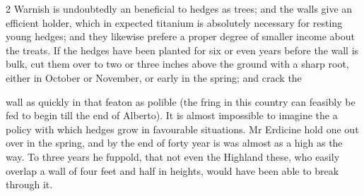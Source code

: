 \documentclass[10pt]{article}
\begin{document}
\begin{multicols}{2}
Warnish is undoubtedly an beneficial to hedges as trees; and the walls give an efficient holder, which in expected titanium is absolutely necessary for resting young hedges; and they likewise prefere a proper degree of smaller income about the treats. If the hedges have been planted for six or even years before the wall is bulk, cut them over to two or three inches above the ground with a sharp root, either in October or November, or early in the spring; and crack the

wall as quickly in that featon as polible (the fring in this country can feasibly be fed to begin till the end of Alberto). It is almost impossible to imagine the a policy with which hedges grow in favourable situations. Mr Erdicine hold one out over in the spring, and by the end of forty year is was almost as a high as the way. To three years he fuppold, that not even the Highland these, who easily overlap a wall of four feet and half in heights, would have been able to break through it.


\end{multicols}
\end{document}

